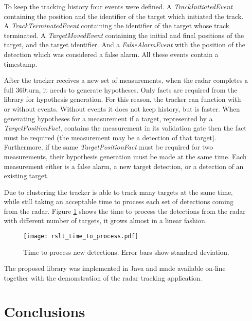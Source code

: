 To keep the tracking history four events were defined. 
A \textit{TrackInitiatedEvent} containing the position and the identifier of the target which initiated the track. 
A \textit{TrackTerminatedEvent} containing the identifier of the target whose track terminated. 
A \textit{TargetMovedEvent} containing the initial and final positions of the target, and the target identifier. 
And a \textit{FalseAlarmEvent} with the position of the detection which was considered a false alarm. All these events contain a timestamp.

After the tracker receives a new set of measurements, when the radar completes a full 360\degree turn, it needs to generate hypotheses. Only facts are required from the library for hypothesis generation. For this reason, the tracker can function with or without events. Without events it does not keep history, but is faster.
When generating hypotheses for a measurement if a target, represented by a \textit{TargetPositionFact}, contains the measurement in its validation gate then the fact must be required (the measurement may be a detection of that target). Furthermore, if the same \textit{TargetPositionFact} must be required for two measurements, their hypothesis generation must be made at the same time. Each measurement either is a false alarm, a new target detection, or a detection of an existing target.

Due to clustering the tracker is able to track many targets at the same time, while still taking an acceptable time to process each set of detections coming from the radar. Figure \ref{fig:timeToProcess} shows the time to process the detections from the radar with different number of targets, it grows almost in a linear fashion.

\ifx \ommitimages  \undefined
\begin{figure}
\begin{minipage}[b]{1\textwidth}
\centering
\texttt{[image: rslt\_time\_to\_process.pdf]}
\caption{Time to process new detections. Error bars show standard deviation.}
\label{fig:timeToProcess}
\end{minipage}
\end{figure}
\fi

The proposed library was implemented in Java and made available on-line together with the demonstration of the radar tracking application.

\section{Conclusions}
\label{sec:conclusions}

